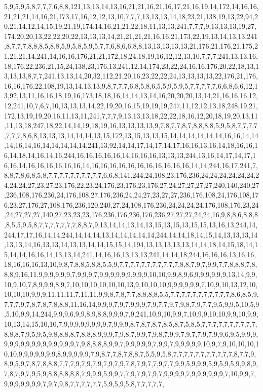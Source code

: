 5,9,5,9,5,8,7,7,7,6,8,8,121,13,13,14,13,16,21,21,16,21,16,17,21,16,19,14,172,14,16,16,21,21,21,14,16,21,173,17,16,12,12,13,10,7,7,7,13,13,13,14,18,23,21,138,19,13,22,94,20,21,14,12,14,15,19,21,19,174,14,16,21,21,22,18,11,13,13,241,7,7,7,9,13,13,13,19,27,174,20,20,13,22,22,20,22,13,13,13,14,21,21,21,21,16,16,21,173,22,19,13,14,13,13,241,8,7,7,7,8,8,8,5,8,8,5,9,5,8,5,9,5,7,7,6,8,6,6,8,8,13,13,13,13,13,21,176,21,176,21,175,21,21,21,14,241,14,16,16,176,21,21,172,18,24,18,19,16,12,12,13,10,7,7,7,241,13,13,16,18,176,22,236,21,15,24,138,23,176,13,241,12,14,174,23,22,24,16,16,176,20,22,18,13,13,13,13,8,7,7,241,13,13,14,20,32,112,21,20,16,23,22,22,24,13,13,13,13,22,176,21,176,16,16,176,22,108,19,13,14,13,13,9,8,7,7,7,6,8,5,8,6,5,5,9,5,9,5,7,7,7,7,7,6,6,8,6,6,12,13,92,13,11,16,16,18,19,16,173,18,18,16,14,14,13,14,16,20,20,20,13,14,21,16,16,16,12,12,241,10,7,6,7,10,13,13,13,14,22,19,20,16,15,19,19,19,247,11,12,12,13,18,248,19,21,172,13,19,19,20,16,11,13,11,241,7,7,7,9,13,13,13,18,22,22,18,16,12,20,18,19,20,13,11,11,13,18,247,18,22,14,14,19,18,19,16,13,13,13,13,9,7,8,7,7,8,7,8,8,8,8,5,9,5,8,7,7,7,7,7,7,7,8,6,8,13,13,13,14,14,14,13,15,172,13,15,13,13,15,14,14,14,14,14,14,16,16,14,14,14,16,14,16,14,14,14,14,14,241,13,92,14,14,17,14,17,14,17,16,16,13,16,14,18,16,16,16,14,18,14,16,14,16,244,16,16,16,16,16,14,16,16,16,13,13,13,244,13,16,14,17,14,17,16,16,14,16,16,16,16,16,16,14,16,16,16,16,16,16,16,16,16,16,16,14,14,244,16,17,241,7,8,8,7,8,6,8,5,8,7,7,7,7,7,7,7,7,7,7,6,6,8,141,244,24,108,23,176,236,24,24,24,24,24,24,24,24,24,27,23,27,23,176,22,23,24,176,23,176,23,176,27,24,27,27,27,27,240,140,240,27,236,108,176,236,24,176,108,27,176,236,24,24,27,23,27,27,236,176,108,24,176,108,176,23,27,176,27,108,176,236,120,240,27,24,108,176,236,24,24,24,24,176,108,176,23,24,24,27,27,27,140,27,23,23,23,176,236,176,236,176,236,27,27,27,24,24,16,9,8,8,6,8,8,8,8,5,5,9,5,8,7,7,7,7,7,7,7,8,8,7,9,13,14,14,13,14,13,15,13,15,13,15,15,13,16,13,244,14,244,17,17,16,14,14,244,14,14,14,13,14,14,14,14,14,244,14,14,18,14,15,14,13,13,13,14,13,13,14,16,13,13,14,13,13,14,14,15,15,14,194,13,13,13,13,13,14,14,18,14,15,18,14,15,14,14,16,16,14,13,13,14,241,14,16,16,13,13,13,241,14,14,18,244,16,16,16,13,16,16,18,16,16,16,13,10,9,8,7,8,8,5,8,8,5,5,9,7,7,7,7,7,7,7,7,7,7,7,8,8,7,9,7,9,9,7,7,8,8,8,7,8,8,8,9,16,11,9,9,9,9,9,9,7,9,9,9,7,9,9,9,9,9,9,9,9,9,10,10,9,9,8,9,6,9,9,9,9,9,9,13,14,9,9,10,9,10,7,8,9,9,9,8,9,7,10,10,10,10,10,10,13,9,10,10,10,9,9,9,9,9,9,7,10,9,10,13,12,10,10,10,10,9,9,9,11,11,11,7,11,11,9,9,8,7,8,7,7,8,8,8,8,5,5,7,7,7,7,7,7,7,7,7,7,7,8,6,8,5,9,7,7,7,9,7,8,7,8,7,8,8,8,11,16,14,9,9,9,7,9,7,9,9,9,7,9,7,7,9,7,9,8,7,9,7,7,9,5,9,9,5,10,5,9,5,10,9,9,14,244,9,9,9,6,9,9,8,9,8,8,9,9,9,7,9,241,10,9,10,9,9,7,10,9,9,10,10,9,9,10,9,9,10,13,14,15,10,10,7,9,9,9,9,9,9,9,9,7,9,9,9,8,7,8,7,8,7,8,5,8,7,5,8,5,7,7,7,7,7,7,7,7,7,7,8,8,8,7,9,5,9,5,9,8,8,8,8,7,8,8,8,9,9,9,7,9,8,7,9,9,7,9,8,7,9,9,7,9,7,7,9,7,9,9,6,9,5,9,9,9,9,9,9,9,9,9,9,9,9,9,9,9,9,7,9,8,8,8,8,9,9,7,9,9,9,9,9,7,9,9,7,9,9,9,9,9,10,9,7,9,10,10,10,10,10,9,9,9,9,9,9,9,8,9,9,9,9,9,7,9,8,7,7,8,7,8,8,7,5,5,9,5,8,7,7,7,7,7,7,7,7,7,7,7,8,7,7,9,8,9,5,9,7,8,7,8,8,8,7,7,7,9,7,9,7,9,7,9,7,9,7,8,7,9,7,7,9,7,7,9,9,5,9,9,9,5,9,5,9,5,9,9,8,9,7,8,7,9,7,9,5,9,8,8,8,8,8,8,7,9,9,9,5,9,9,7,7,9,7,9,7,9,7,9,9,9,9,7,9,9,9,9,9,9,7,10,9,9,7,9,9,9,9,9,9,9,7,9,7,9,8,7,7,7,7,7,7,5,9,5,9,5,8,7,7,7,7,7,